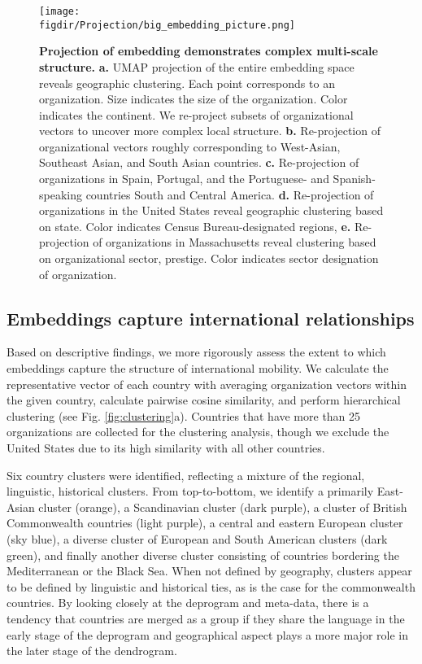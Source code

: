 \documentclass[12pt]{article} %
\def\figdir{../Figs}
\begin{document}
\begin{figure}[hp!]
	\centering
	\label{fig:projection}
	\texttt{[image: \\figdir/Projection/big\_embedding\_picture.png]}
	\caption{
		\textbf{Projection of embedding demonstrates complex multi-scale structure.}
		\textbf{a.}
		UMAP projection \autocite{mcinnes2018umap} of the entire embedding space reveals geographic clustering.
		Each point corresponds to an organization. 
		Size indicates the size of the organization.
		Color indicates the continent. 
		We re-project subsets of organizational vectors to uncover more complex local structure.
		\textbf{b.} Re-projection of organizational vectors roughly corresponding to West-Asian, Southeast Asian, and South Asian countries. 
		\textbf{c.} Re-projection of organizations in Spain, Portugal, and the Portuguese- and Spanish-speaking countries South and Central America. 
		\textbf{d.} Re-projection of organizations in the United States reveal geographic clustering based on state.
		Color indicates Census Bureau-designated regions,
		\textbf{e.} Re-projection of organizations in Massachusetts reveal clustering based on organizational sector, prestige. 
		Color indicates sector designation of organization. 
	}
\end{figure}


\subsection*{Embeddings capture international relationships}

Based on descriptive findings, we more rigorously assess the extent to which embeddings capture the structure of international mobility. 
We calculate the representative vector of each country with averaging organization vectors within the given country, calculate pairwise cosine similarity, and perform hierarchical clustering (see Fig. \ref{fig:clustering}a).
Countries that have more than 25 organizations are collected for the clustering analysis, though we exclude the United States due to its high similarity with all other countries.

Six country clusters were identified, reflecting a mixture of the regional, linguistic, historical clusters. 
From top-to-bottom, we identify a primarily East-Asian cluster (orange), a Scandinavian cluster (dark purple), a cluster of British Commonwealth countries (light purple), a central and eastern European cluster (sky blue), a diverse cluster of European and South American clusters (dark green), and finally another diverse cluster consisting of countries bordering the Mediterranean or the Black Sea.
When not defined by geography, clusters appear to be defined by linguistic and historical ties, as is the case for the commonwealth countries. 
By looking closely at the deprogram and meta-data, there is a tendency that countries are merged as a group if they share the language in the early stage of the deprogram and geographical aspect plays a more major role in the later stage of the dendrogram.
\end{document}
